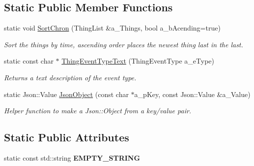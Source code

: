 \subsection*{Static Public Member Functions}
\begin{DoxyCompactItemize}
\item 
\mbox{\label{class_i_thing_abf6d252bb2f43faa5dd3e517a86fbf25}} 
static void \hyperlink{class_i_thing_abf6d252bb2f43faa5dd3e517a86fbf25}{Sort\+Chron} (Thing\+List \&a\+\_\+\+Things, bool a\+\_\+b\+Acending=true)
\begin{DoxyCompactList}\small\item\em Sort the things by time, ascending order places the newest thing last in the last. \end{DoxyCompactList}\item 
\mbox{\label{class_i_thing_a04d8dafff2c7e747e619b49fa004b972}} 
static const char $\ast$ \hyperlink{class_i_thing_a04d8dafff2c7e747e619b49fa004b972}{Thing\+Event\+Type\+Text} (Thing\+Event\+Type a\+\_\+e\+Type)
\begin{DoxyCompactList}\small\item\em Returns a text description of the event type. \end{DoxyCompactList}\item 
\mbox{\label{class_i_thing_a3d297608c533e99877cf4debb383d6e9}} 
static Json\+::\+Value \hyperlink{class_i_thing_a3d297608c533e99877cf4debb383d6e9}{Json\+Object} (const char $\ast$a\+\_\+p\+Key, const Json\+::\+Value \&a\+\_\+\+Value)
\begin{DoxyCompactList}\small\item\em Helper function to make a Json\+::\+Object from a key/value pair. \end{DoxyCompactList}\end{DoxyCompactItemize}
\subsection*{Static Public Attributes}
\begin{DoxyCompactItemize}
\item 
\mbox{\label{class_i_thing_acc0b0d00c1a667fd8e8cf074ea6efdda}} 
static const std\+::string {\bfseries E\+M\+P\+T\+Y\+\_\+\+S\+T\+R\+I\+NG}
\end{DoxyCompactItemize}
